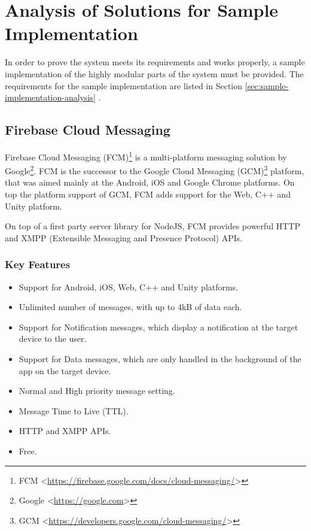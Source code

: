 \section{Analysis of Solutions for Sample Implementation}
In order to prove the system meets its requirements and works properly, a sample implementation of the highly modular parts of the system must be provided. The requirements for the sample implementation are listed in Section \ref{sec:sample-implementation-analysis} .

\subsection{Firebase Cloud Messaging}
Firebase Cloud Messaging (FCM)\footnote{FCM <\url{https://firebase.google.com/docs/cloud-messaging/}>} is a multi-platform messaging solution by Google\footnote{Google <\url{https://google.com}>}. FCM is the successor to the Google Cloud Messaging (GCM)\footnote{GCM <\url{https://developers.google.com/cloud-messaging/}>} platform, that was aimed mainly at the Android, iOS and Google Chrome platforms. On top the platform support of GCM, FCM adds support for the Web, C++ and Unity platform.

On top of a first party server library for NodeJS, FCM provides powerful HTTP and XMPP (Extensible Messaging and Presence Protocol) APIs.

\subsubsection*{Key Features\cite{fcm}}
\begin{itemize}
\item Support for Android, iOS, Web, C++ and Unity platforms.
\item Unlimited number of messages, with up to 4kB of data each.
\item Support for Notification messages, which display a notification at the target device to the user.
\item Support for Data messages, which are only handled in the background of the app on the target device.
\item Normal and High priority message setting.
\item Message Time to Live (TTL).
\item HTTP and XMPP APIs.
\item Free.
\end{itemize}

